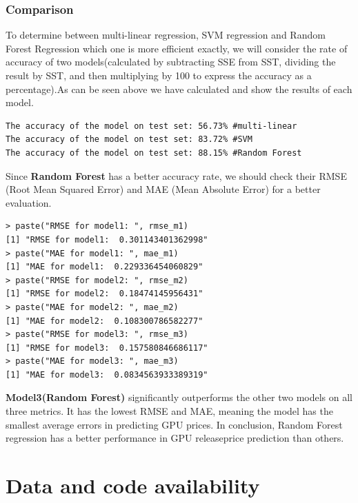 \documentclass[a4paper]{article}
\theoremstyle{definition}
\begin{document}
\subsubsection{Comparison}
To determine between multi-linear regression, SVM regression and Random Forest Regression which one is more efficient exactly, we will consider the rate of accuracy of two models(calculated by subtracting SSE from SST, dividing the result by SST, and then multiplying by 100 to express the accuracy as a percentage).As can be seen above we have calculated and show the results of each model.
\begin{mdframed}[leftline=false,rightline=false,backgroundcolor=lightblue!10,nobreak=false]
    \begin{verbatim}
The accuracy of the model on test set: 56.73% #multi-linear
The accuracy of the model on test set: 83.72% #SVM 
The accuracy of the model on test set: 88.15% #Random Forest
\end{verbatim}
\end{mdframed}
Since \textbf{Random Forest} has a better accuracy rate, we should check their RMSE (Root Mean Squared Error) and MAE (Mean Absolute Error) for a better evaluation.

\begin{mdframed}[leftline=false,rightline=false,backgroundcolor=lightblue!10,nobreak=false]
    \begin{verbatim}
> paste("RMSE for model1: ", rmse_m1)
[1] "RMSE for model1:  0.301143401362998"
> paste("MAE for model1: ", mae_m1)
[1] "MAE for model1:  0.229336454060829"
> paste("RMSE for model2: ", rmse_m2)
[1] "RMSE for model2:  0.18474145956431"
> paste("MAE for model2: ", mae_m2)
[1] "MAE for model2:  0.108300786582277"
> paste("RMSE for model3: ", rmse_m3)
[1] "RMSE for model3:  0.157580846686117"
> paste("MAE for model3: ", mae_m3)
[1] "MAE for model3:  0.0834563933389319"
\end{verbatim}
\end{mdframed}
\textbf{Model3(Random Forest)} significantly outperforms the other two models on all three metrics. It has the lowest RMSE and MAE, meaning the model has the smallest average errors in predicting GPU prices. In conclusion, Random Forest regression has a better performance in GPU release\textunderscore price prediction than others.
\pagebreak
\section{Data and code availability}
\end{document}
